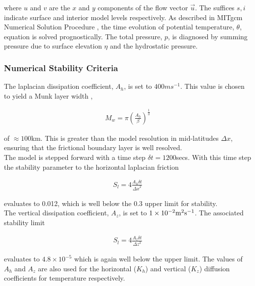 \noindent where $u$ and $v$ are the $x$ and $y$ components of the
flow vector $\vec{u}$. The suffices ${s},{i}$ indicate surface and
interior model levels respectively. As described in
MITgcm Numerical Solution Procedure \cite{MITgcm_Numerical_Scheme}, the time 
evolution of potential temperature, $\theta$, equation is solved prognostically.
The total pressure, $p$, is diagnosed by summing pressure due to surface 
elevation $\eta$ and the hydrostatic pressure.
\\

\subsubsection{Numerical Stability Criteria}

The laplacian dissipation coefficient, $A_{h}$, is set to $400 m s^{-1}$.
This value is chosen to yield a Munk layer width \cite{Adcroft_thesis},

\begin{eqnarray}
\label{EQ:munk_layer}
M_{w} = \pi ( \frac { A_{h} }{ \beta } )^{\frac{1}{3}}
\end{eqnarray}

\noindent  of $\approx 100$km. This is greater than the model
resolution in mid-latitudes $\Delta x$, ensuring that the frictional 
boundary layer is well resolved.
\\

\noindent The model is stepped forward with a 
time step $\delta t=1200$secs. With this time step the stability 
parameter to the horizontal laplacian friction \cite{Adcroft_thesis}

\begin{eqnarray}
\label{EQ:laplacian_stability}
S_{l} = 4 \frac{A_{h} \delta t}{{\Delta x}^2}
\end{eqnarray}

\noindent evaluates to 0.012, which is well below the 0.3 upper limit
for stability. 
\\

\noindent The vertical dissipation coefficient, $A_{z}$, is set to 
$1\times10^{-2} {\rm m}^2{\rm s}^{-1}$. The associated stability limit

\begin{eqnarray}
\label{EQ:laplacian_stability_z}
S_{l} = 4 \frac{A_{z} \delta t}{{\Delta z}^2}
\end{eqnarray}

\noindent evaluates to $4.8 \times 10^{-5}$ which is again well below
the upper limit.
The values of $A_{h}$ and $A_{z}$ are also used for the horizontal ($K_{h}$) 
and vertical ($K_{z}$) diffusion coefficients for temperature respectively.
\\

